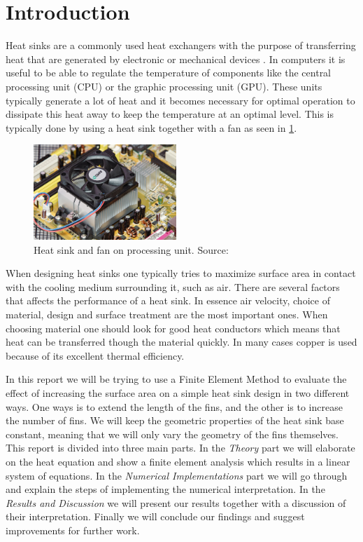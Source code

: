 \section{Introduction}
Heat sinks are a commonly used heat exchangers with the purpose of transferring heat that are generated by electronic or mechanical devices \cite{wiki_hs}. In computers it is useful to be able to regulate the temperature of components like the central processing unit (CPU) or the graphic processing unit	(GPU). These units typically generate a lot of heat and it becomes necessary for optimal operation to dissipate this heat away to keep the temperature at an optimal level. This is typically done by using a heat sink together with a fan as seen in \cref{fig:heatsink_and_fan}. 

\begin{figure}
	\begin{center}
		\includegraphics[width=0.48\textwidth]{../figures/heatsink_and_fan.jpg}
	\end{center}
	\caption{Heat sink and fan on processing unit. Source: \cite{wiki_hs}}
    \label{fig:heatsink_and_fan}
\end{figure}

When designing heat sinks one typically tries to maximize surface area in contact with the cooling medium surrounding it, such as air. There are several factors that affects the performance of a heat sink. In essence air velocity, choice of material, design and surface treatment are the most important ones. When choosing material one should look for good heat conductors which means that heat can be transferred though the material quickly. In many cases copper is used because of its excellent thermal efficiency.

In this report we will be trying to use a Finite Element Method to evaluate the effect of increasing the surface area on a simple heat sink design in two different ways. One ways is to extend the length of the fins, and the other is to increase the number of fins. We will keep the geometric properties of the heat sink base constant, meaning that we will only vary the geometry of the fins themselves. This report is divided into three main parts. In the \textit{Theory} part we will elaborate on the heat equation and show a finite element analysis which results in a linear system of equations. In the \textit{Numerical Implementations} part we will go through and explain the steps of implementing the numerical interpretation. In the \textit{Results and Discussion} we will present our results together with a discussion of their interpretation. Finally we will conclude our findings and suggest improvements for further work.
